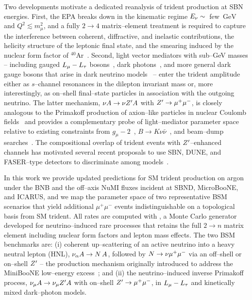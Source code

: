 Two developments motivate a dedicated reanalysis of trident production
at SBN energies.  First, the EPA breaks down in the kinematic regime
$E_\nu \sim$~few~$\text{GeV}$ and $Q^2 \lesssim m_\mu^2$, and a fully
$2\to 4$ matrix--element treatment is required to capture the
interference between coherent, diffractive, and inelastic
contributions, the helicity structure of the leptonic final state, and
the smearing induced by the nuclear form factor of
${}^{40}\text{Ar}$~\cite{Ballett:2018uuc,Zhou:2019vxt,Zhou:2019frk}.
Second, light vector mediators with sub--GeV masses -- including
gauged $L_\mu - L_\tau$ bosons~\cite{He:1990pn,He:1991qd,Foot:1990mn}, dark
photons~\cite{Holdom:1985ag,Pospelov:2007mp}, and more general dark
gauge bosons that arise in dark neutrino
models~\cite{Bertuzzo:2018itn,Ballett:2018ynz,Ballett:2019pyw,
Abdullahi:2020nyr} -- enter the trident amplitude either as $s$--channel
resonances in the dilepton invariant mass or, more interestingly, as
on--shell final--state particles in association with the outgoing
neutrino.  The latter mechanism, $\nu A \to \nu Z^{\prime} A$ with
$Z^{\prime} \to \mu^+\mu^-$, is closely analogous to the Primakoff production
of axion--like particles in nuclear Coulomb fields~\cite{Primakoff:1951pj}
and provides a complementary probe of light--mediator parameter space
relative to existing constraints from
$g_\mu - 2$~\cite{Bennett:2006fi,Aoyama:2020ynm,Muong-2:2023cdq},
$B \to K \nu \bar\nu$~\cite{Belle-II:2023esi}, and beam--dump
searches~\cite{Andreas:2012mt,Bauer:2018onh}.  The compositional
overlap of trident events with $Z^{\prime}$--enhanced channels has motivated
several recent proposals to use SBN, DUNE, and FASER--type detectors
to discriminate among models~\cite{Altmannshofer:2019zhy,
Argyropoulos:2022wjm,Plestid:2020vqf,Brdar:2020dpr}.

In this work we provide updated predictions for SM trident production
on argon under the BNB and the off--axis NuMI fluxes incident at
SBND, MicroBooNE, and ICARUS, and we map the parameter space of two
representative BSM scenarios that yield additional $\mu^+\mu^-$ events
indistinguishable on a topological basis from SM trident.  All rates
are computed with \Neptune, a Monte Carlo generator developed for
neutrino--induced rare processes that retains the full $2\to n$ matrix
element including nuclear form factors and lepton mass effects.  The
two BSM benchmarks are: (i) coherent up--scattering of an active
neutrino into a heavy neutral lepton (HNL), $\nu_\alpha A \to N\, A$,
followed by $N \to \nu \mu^+\mu^-$ via an off--shell or on--shell
$Z^{\prime}$ -- the production mechanism originally introduced to address the
MiniBooNE low--energy excess~\cite{Bertuzzo:2018itn,Ballett:2018ynz,
Ballett:2019pyw,Abdullahi:2020nyr}; and (ii) the
neutrino--induced inverse Primakoff process,
$\nu_\mu A \to \nu_\mu Z^{\prime} A$ with on--shell $Z^{\prime} \to \mu^+\mu^-$, in
$L_\mu - L_\tau$ and kinetically mixed dark--photon models.

